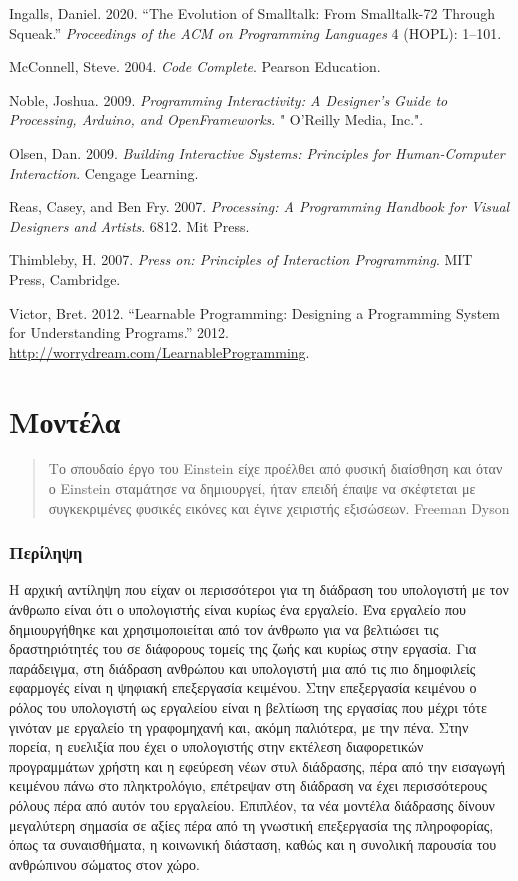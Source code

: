 \documentclass[
]{article}
\begin{document}
Ingalls, Daniel. 2020. {``The Evolution of Smalltalk: From Smalltalk-72
Through Squeak.''} \emph{Proceedings of the ACM on Programming
Languages} 4 (HOPL): 1--101.

McConnell, Steve. 2004. \emph{Code Complete}. Pearson Education.

Noble, Joshua. 2009. \emph{Programming Interactivity: A Designer's Guide
to Processing, Arduino, and OpenFrameworks}. " O'Reilly Media, Inc.".

Olsen, Dan. 2009. \emph{Building Interactive Systems: Principles for
Human-Computer Interaction}. Cengage Learning.

Reas, Casey, and Ben Fry. 2007. \emph{Processing: A Programming Handbook
for Visual Designers and Artists}. 6812. Mit Press.

Thimbleby, H. 2007. \emph{Press on: Principles of Interaction
Programming}. MIT Press, Cambridge.

Victor, Bret. 2012. {``Learnable Programming: Designing a Programming
System for Understanding Programs.''} 2012.
\url{http://worrydream.com/LearnableProgramming}.

\hypertarget{ux3bcux3bfux3bdux3c4ux3adux3bbux3b1}{%
\section{Μοντέλα}\label{ux3bcux3bfux3bdux3c4ux3adux3bbux3b1}}

\begin{quote}
Το σπουδαίο έργο του Einstein είχε προέλθει από φυσική διαίσθηση και
όταν ο Einstein σταμάτησε να δημιουργεί, ήταν επειδή έπαψε να σκέφτεται
με συγκεκριμένες φυσικές εικόνες και έγινε χειριστής εξισώσεων. Freeman
Dyson
\end{quote}

\hypertarget{ux3c0ux3b5ux3c1ux3afux3bbux3b7ux3c8ux3b7}{%
\subsubsection{Περίληψη}\label{ux3c0ux3b5ux3c1ux3afux3bbux3b7ux3c8ux3b7}}

Η αρχική αντίληψη που είχαν οι περισσότεροι για τη διάδραση του
υπολογιστή με τον άνθρωπο είναι ότι ο υπολογιστής είναι κυρίως ένα
εργαλείο. Ένα εργαλείο που δημιουργήθηκε και χρησιμοποιείται από τον
άνθρωπο για να βελτιώσει τις δραστηριότητές του σε διάφορους τομείς της
ζωής και κυρίως στην εργασία. Για παράδειγμα, στη διάδραση ανθρώπου και
υπολογιστή μια από τις πιο δημοφιλείς εφαρμογές είναι η ψηφιακή
επεξεργασία κειμένου. Στην επεξεργασία κειμένου ο ρόλος του υπολογιστή
ως εργαλείου είναι η βελτίωση της εργασίας που μέχρι τότε γινόταν με
εργαλείο τη γραφομηχανή και, ακόμη παλιότερα, με την πένα. Στην πορεία,
η ευελιξία που έχει ο υπολογιστής στην εκτέλεση διαφορετικών
προγραμμάτων χρήστη και η εφεύρεση νέων στυλ διάδρασης, πέρα από την
εισαγωγή κειμένου πάνω στο πληκτρολόγιο, επέτρεψαν στη διάδραση να έχει
περισσότερους ρόλους πέρα από αυτόν του εργαλείου. Επιπλέον, τα νέα
μοντέλα διάδρασης δίνουν μεγαλύτερη σημασία σε αξίες πέρα από τη
γνωστική επεξεργασία της πληροφορίας, όπως τα συναισθήματα, η κοινωνική
διάσταση, καθώς και η συνολική παρουσία του ανθρώπινου σώματος στον
χώρο.
\end{document}
